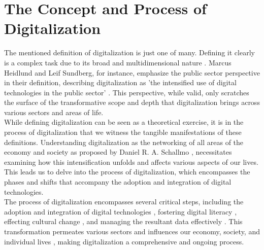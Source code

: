 \documentclass[12pt]{article}
\begin{document}
\section{The Concept and Process of Digitalization}
The mentioned definition of digitalization is just one of many. Defining it clearly is a complex task due to its broad and multidimensional nature \cite{JasonBloomberg.2018}. Marcus Heidlund and Leif Sundberg, for instance, emphasize the public sector perspective in their definition, describing digitalization as 'the intensified use of digital technologies in the public sector' \cite{Heidlund.2023}. This perspective, while valid, only scratches the surface of the transformative scope and depth that digitalization brings across various sectors and areas of life. \\
While defining digitalization can be seen as a theoretical exercise, it is in the process of digitalization that we witness the tangible manifestations of these definitions. Understanding digitalization as  the networking of all areas of the economy and society as proposed by Daniel R. A. Schallmo \cite{Schallmo.}, necessitates examining how this intensification unfolds and affects various aspects of our lives. This leads us to delve into the process of digitalization, which encompasses the phases and shifts that accompany the adoption and integration of digital technologies. \\
The process of digitalization encompasses several critical steps, including the adoption and integration of digital technologies \cite{GablerWirtschaftslexikon.5312023}, fostering digital literacy \cite{vanAckeren.2019}, effecting cultural change \cite{Nevmatulina.2022}, and managing the resultant data effectively \cite{DORDUNCU.2021}. This transformation permeates various sectors and influences our economy, society, and individual lives \cite{HenningHummert.2018}, making digitalization a comprehensive and ongoing process.
\end{document}
